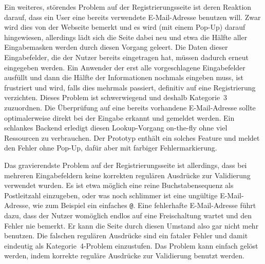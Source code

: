 \label{prob:reg:popup}
{Ein weiteres, störendes Problem auf der Registrierungsseite ist deren Reaktion darauf, dass ein User eine bereits verwendete E-Mail-Adresse benutzen will. Zwar wird dies von der Webseite bemerkt und es wird (mit einem Pop-Up) darauf hingewiesen, allerdings lädt sich die Seite dabei neu und etwa die Hälfte aller Eingabemasken werden durch diesen Vorgang geleert. Die Daten dieser Eingabefelder, die der Nutzer bereits eingetragen hat, müssen dadurch erneut eingegeben werden.
}
{Ein Anwender der erst alle vorgeschlagene Eingabefelder ausfüllt und dann die Hälfte der Informationen nochmals eingeben muss, ist frustriert und wird, falls dies mehrmals passiert, definitiv auf eine Registrierung verzichten. Dieses Problem ist schwerwiegend und deshalb Kategorie~3 zuzuordnen.
}
{Die Überprüfung auf eine bereits vorhandene E-Mail-Adresse sollte optimalerweise direkt bei der Eingabe erkannt und gemeldet werden. Ein schlankes Backend erledigt diesen Lookup-Vorgang on-the-fly ohne viel Ressourcen zu verbrauchen. Der Prototyp enthält ein solches Feature und meldet den Fehler ohne Pop-Up, dafür aber mit farbiger Fehlermarkierung.
}  
\label{prob:reg:vergivenmail}


{Das gravierendste Problem auf der Registrierungsseite ist allerdings, dass bei mehreren Eingabefeldern keine korrekten regulären Ausdrücke zur Validierung verwendet wurden. Es ist etwa möglich eine reine Buchstabensequenz als Postleitzahl einzugeben, oder was noch schlimmer ist eine ungültige E-Mail-Adresse, wie zum Beispiel ein einfaches \glqq \texttt{@}\grqq.
}
{Eine fehlerhafte E-Mail-Adresse führt dazu, dass der Nutzer womöglich endlos auf eine Freischaltung wartet und den Fehler nie bemerkt. Er kann die Seite durch diesen Umstand also gar nicht mehr benutzen. Die falschen regulären Ausdrücke sind ein fataler Fehler und damit eindeutig als Kategorie~4-Problem einzustufen.}
{Das Problem kann einfach gelöst werden, indem korrekte reguläre Ausdrücke zur Validierung benutzt werden.
} 
\label{prob:reg:regex}

